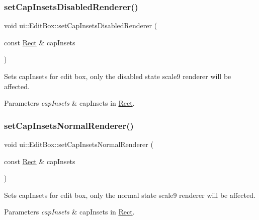 \subsubsection{\texorpdfstring{set\+Cap\+Insets\+Disabled\+Renderer()}{setCapInsetsDisabledRenderer()}}
{\footnotesize\ttfamily void ui\+::\+Edit\+Box\+::set\+Cap\+Insets\+Disabled\+Renderer (\begin{DoxyParamCaption}\item[{const \hyperlink{classRect}{Rect} \&}]{cap\+Insets }\end{DoxyParamCaption})}

Sets cap\+Insets for edit box, only the disabled state scale9 renderer will be affected.


\begin{DoxyParams}{Parameters}
{\em cap\+Insets} & cap\+Insets in \hyperlink{classRect}{Rect}. \\
\hline
\end{DoxyParams}
\mbox{\label{classui_1_1EditBox_a9500ec04f104bd549423336a8409a1c3}} 
\subsubsection{\texorpdfstring{set\+Cap\+Insets\+Normal\+Renderer()}{setCapInsetsNormalRenderer()}}
{\footnotesize\ttfamily void ui\+::\+Edit\+Box\+::set\+Cap\+Insets\+Normal\+Renderer (\begin{DoxyParamCaption}\item[{const \hyperlink{classRect}{Rect} \&}]{cap\+Insets }\end{DoxyParamCaption})}

Sets cap\+Insets for edit box, only the normal state scale9 renderer will be affected.


\begin{DoxyParams}{Parameters}
{\em cap\+Insets} & cap\+Insets in \hyperlink{classRect}{Rect}. \\
\hline
\end{DoxyParams}
\mbox{\label{classui_1_1EditBox_a724b6951bf411a903a92b5cc4aa96afe}} 
